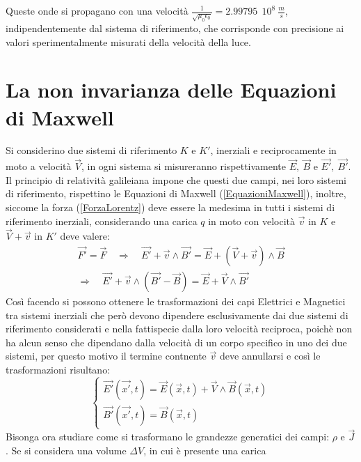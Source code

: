 Queste onde si propagano con una velocità $\frac{1}{\sqrt{\mu_0\epsilon_0}}=2.99795\ \ 10^8\  \frac{m}{s}$, 
indipendentemente dal sistema di riferimento, che corrisponde con precisione ai valori
 sperimentalmente misurati della velocità della luce.  

 \section{La non invarianza delle Equazioni di Maxwell}

 Si considerino due sistemi di riferimento $K$ e $K'$, inerziali e reciprocamente in moto a velocità $\vec{V}$, in ogni sistema 
 si misureranno rispettivamente $\vec{E},\ \vec{B}$ e $\vec{E'},\ \vec{B'}$. Il principio di relatività galileiana impone che 
 questi due campi, nei loro sistemi di riferimento, rispettino le Equazioni di Maxwell (\ref{EquazioniMaxwell}), inoltre, siccome la forza (\ref{ForzaLorentz})
 deve essere la medesima in tutti i sistemi di riferimento inerziali, considerando una carica $q$ in moto con velocità $\vec{v}$ 
 in $K$ e $\vec{V}+\vec{v}$ in $K'$ deve valere:
 \begin{equation*}
	\begin{gathered}
		\vec{F'}=\vec{F}\quad\Rightarrow\quad \vec{E'}+\vec{v}\wedge\vec{B'}=\vec{E}+(\vec{V}+\vec{v})\wedge\vec{B}\\
         \Rightarrow\quad \vec{E'}+\vec{v}\wedge(\vec{B'}-\vec{B})=\vec{E}+\vec{V}\wedge\vec{B'}
	\end{gathered}
 \end{equation*}
Così facendo si possono ottenere le trasformazioni dei capi Elettrici e Magnetici tra sistemi inerziali che però devono dipendere esclusivamente dai due sistemi di riferimento 
considerati e nella fattispecie dalla loro velocità reciproca, poichè non ha alcun senso che dipendano dalla velocità di un corpo 
specifico in uno dei due sistemi, per questo motivo il termine contnente $\vec{v}$ deve annullarsi e così le trasformazioni risultano:
\begin{equation}
	\begin{cases}
		\vec{E'}(\vec{x'},t)=\vec{E}(\vec{x},t)+\vec{V}\wedge\vec{B}(\vec{x},t)\\
		\vec{B'}(\vec{x'},t)=\vec{B}(\vec{x},t)
	\end{cases}
	\label{TrasfGalileoEB}
\end{equation}
Bisonga ora studiare come si trasformano le grandezze generatici dei campi:
$\rho$ e $\vec{J}$. Se si considera una volume $\Delta V$, in cui è presente una carica 
